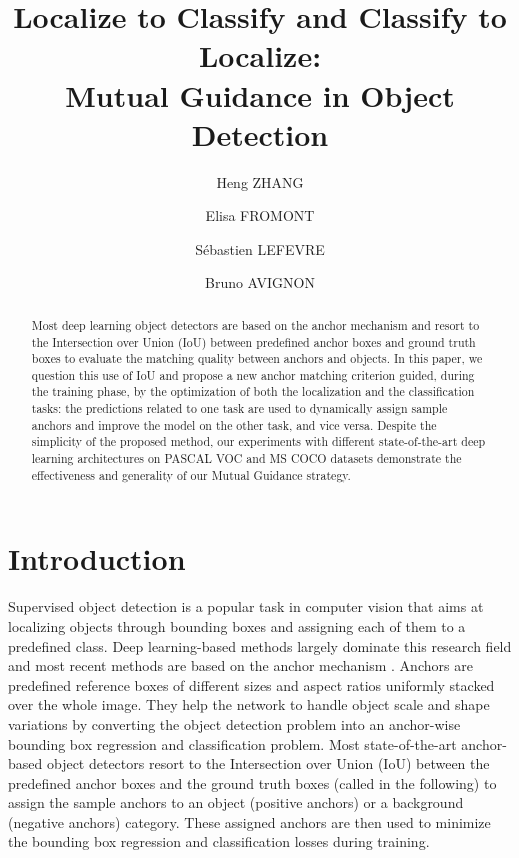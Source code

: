 \documentclass[runningheads]{llncs}
\begin{document}
\pagestyle{headings}
\mainmatter

\def\ACCV20SubNumber{256}  

\title{Localize to Classify and Classify to Localize: \\ Mutual Guidance in Object Detection} 
\author{Heng ZHANG \and
Elisa FROMONT  \and
Sébastien LEFEVRE \and
Bruno AVIGNON}

\maketitle

\begin{abstract}
Most deep learning object detectors are based on the anchor mechanism and resort to the Intersection over Union (IoU) between predefined anchor boxes and ground truth boxes to evaluate the matching quality between anchors and objects. In this paper, we question this use of IoU and propose a new anchor matching criterion guided, during the training phase, by the optimization of both the localization and the classification tasks: the predictions related to one task are used to dynamically assign sample anchors and improve the model on the other task, and vice versa. Despite the simplicity of the proposed method, our experiments with different state-of-the-art deep learning architectures on PASCAL VOC and MS COCO datasets demonstrate the effectiveness and generality of our Mutual Guidance strategy.
\end{abstract}

\section{Introduction}
\label{sec:intro}

Supervised object detection is a popular task in computer vision that aims at localizing objects through bounding boxes and assigning each of them to a predefined class. Deep learning-based methods largely dominate this research field and most recent methods are based on the anchor mechanism \cite{FasterRCNN,RFCN,FPN,PANet,LibraRCNN,CascadeRCNN,SSD,YOLOv3,RetinaNet,FSSD,RFBNet,M2Det}. 
Anchors are predefined reference boxes of different sizes and aspect ratios uniformly stacked over the whole image. They help the network to handle object scale and shape variations by converting the object detection problem into an anchor-wise bounding box regression and classification problem. Most state-of-the-art anchor-based object detectors resort to the Intersection over Union (IoU) between the predefined anchor boxes and the ground truth boxes (called  in the following) to assign the sample anchors to an object (positive anchors) or a background (negative anchors) category. These assigned anchors are then used to minimize the bounding box regression and classification losses during training.
\end{document}
